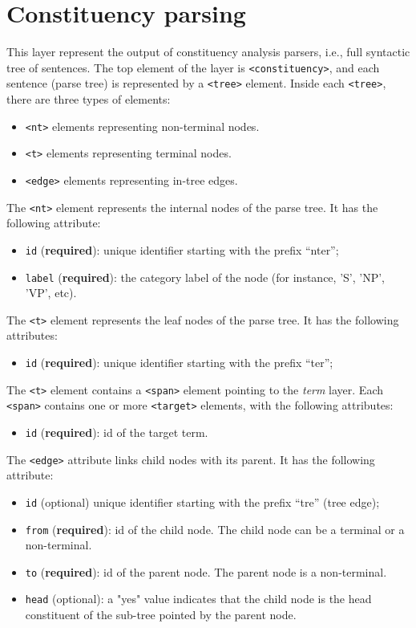 \section{Constituency parsing}
\label{sec:constituency-parsing}

This layer represent the output of constituency analysis parsers, i.e., full
syntactic tree of sentences. The top element of the layer is
\texttt{<constituency>}, and each sentence (parse tree) is represented by a
\texttt{<tree>} element. Inside each \texttt{<tree>}, there are three types
of elements:
\begin{itemize}
\item \texttt{<nt>} elements representing non-terminal nodes.
\item \texttt{<t>} elements representing terminal nodes.
\item \texttt{<edge>} elements representing in-tree edges.
\end{itemize}

The \texttt{<nt>} element represents the internal nodes of the parse
tree. It has the following attribute:
\begin{itemize}
\item \texttt{id} (\textbf{required}): unique identifier starting with the
  prefix ``nter'';
\item \texttt{label} (\textbf{required}): the category label of the node
  (for instance, 'S', 'NP', 'VP', etc).
\end{itemize}

The \texttt{<t>} element represents the leaf nodes of the parse tree. It has
the following attributes:
\begin{itemize}
\item \texttt{id} (\textbf{required}): unique identifier starting with the
  prefix ``ter'';
\end{itemize}

The \texttt{<t>} element contains a \texttt{<span>} element pointing to the
\emph{term} layer.  Each \texttt{<span>} contains one or more
\texttt{<target>} elements, with the following attributes:

\begin{itemize}
\item \texttt{id} (\textbf{required}): id of the target term.
\end{itemize}

The \texttt{<edge>} attribute links child nodes with its parent. It has the
following attribute:

\begin{itemize}
\item \texttt{id} (optional) unique identifier starting with the
  prefix ``tre'' (tree edge);
\item \texttt{from} (\textbf{required}): id of the child node. The child node can be a terminal
  or a non-terminal.
\item \texttt{to} (\textbf{required}): id of the parent node. The parent
  node is a non-terminal.
\item \texttt{head} (optional): a "yes" value indicates that the child node
  is the head constituent of the sub-tree pointed by the parent node.
\end{itemize}

